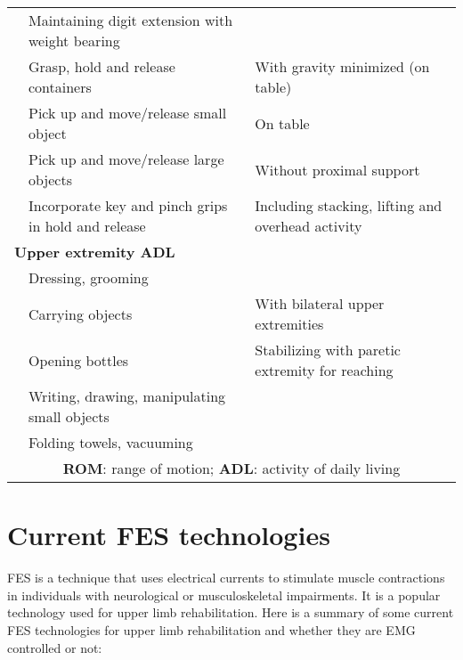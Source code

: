 \begin{table}[htbp]
\begin{tabular}{p{2.5cm}p{5cm}p{7cm}}
     & Maintaining digit extension with weight bearing & \\
     & Grasp, hold and release containers & With gravity minimized (on table) \\
     & Pick up and move/release small object & On table \\
     & Pick up and move/release large objects & Without proximal support \\
     & Incorporate key and pinch grips in hold and release & Including stacking, lifting and overhead activity \\
    \multicolumn{3}{l}{\textbf{Upper extremity ADL}} \\
     & Dressing, grooming & \\
     & Carrying objects & With bilateral upper extremities \\
     & Opening bottles & Stabilizing with paretic extremity for reaching \\
     & Writing, drawing, manipulating small objects & \\
     & Folding towels, vacuuming\\
     \bottomrule
     \multicolumn{3}{c}{ \textbf{ROM}: range of motion; \textbf{ADL}: activity of daily living}
    \end{tabular}
    \label{BankofExercises}
\end{table}

\newpage
\section{Current FES technologies}
FES is a technique that uses electrical currents to stimulate muscle contractions in individuals with neurological or musculoskeletal impairments. It is a popular technology used for upper limb rehabilitation. Here is a summary of some current FES technologies for upper limb rehabilitation and whether they are EMG controlled or not:

